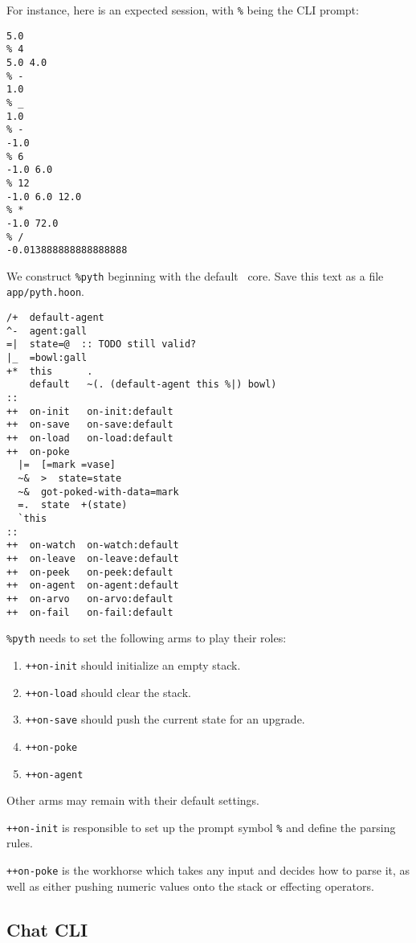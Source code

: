 For instance, here is an expected session, with \texttt{\%} being the CLI prompt:

\begin{lstlisting}[style=nonumbers]
% 5
5.0
% 4
5.0 4.0
% -
1.0
% _
1.0
% -
-1.0
% 6
-1.0 6.0
% 12
-1.0 6.0 12.0
% *
-1.0 72.0
% /
-0.013888888888888888
\end{lstlisting}

We construct \texttt{\%pyth} beginning with the default \gall~core.  Save this text as a file \texttt{app/pyth.hoon}.

\begin{lstlisting}[caption={Default \gall~core for \texttt{\%pyth}}]
/+  default-agent
^-  agent:gall
=|  state=@  :: TODO still valid?
|_  =bowl:gall
+*  this      .
    default   ~(. (default-agent this %|) bowl)
::
++  on-init   on-init:default
++  on-save   on-save:default
++  on-load   on-load:default
++  on-poke
  |=  [=mark =vase]
  ~&  >  state=state
  ~&  got-poked-with-data=mark
  =.  state  +(state)
  `this
::
++  on-watch  on-watch:default
++  on-leave  on-leave:default
++  on-peek   on-peek:default
++  on-agent  on-agent:default
++  on-arvo   on-arvo:default
++  on-fail   on-fail:default
\end{lstlisting}

\texttt{\%pyth} needs to set the following arms to play their roles:

\begin{enumerate}
  \item  \texttt{++on-init} should initialize an empty stack.
  \item  \texttt{++on-load} should clear the stack.
  \item  \texttt{++on-save} should push the current state for an upgrade.
  \item  \texttt{++on-poke}
  \item  \texttt{++on-agent}
\end{enumerate}

Other arms may remain with their default settings.

\texttt{++on-init} is responsible to set up the prompt symbol \texttt{\%} and define the parsing rules.

\texttt{++on-poke} is the workhorse which takes any input and decides how to parse it, as well as either pushing numeric values onto the stack or effecting operators.


\subsection{Chat CLI}

